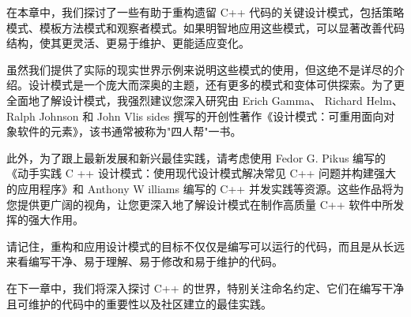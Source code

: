 在本章中，我们探讨了一些有助于重构遗留 C++ 代码的关键设计模式，包括策略模式、模板方法模式和观察者模式。如果明智地应用这些模式，可以显著改善代码结构，使其更灵活、更易于维护、更能适应变化。

虽然我们提供了实际的现实世界示例来说明这些模式的使用，但这绝不是详尽的介绍。设计模式是一个庞大而深奥的主题，还有更多的模式和变体可供探索。为了更全面地了解设计模式，我强烈建议您深入研究由 Erich Gamma、 Richard Helm、 Ralph Johnson 和 John Vlis sides 撰写的开创性著作《设计模式：可重用面向对象软件的元素》，该书通常被称为"四人帮"一书。

此外，为了跟上最新发展和新兴最佳实践，请考虑使用 Fedor G. Pikus 编写的《动手实践 C ++ 设计模式：使用现代设计模式解决常见 C++ 问题并构建强大的应用程序》和 Anthony W illiams 编写的 C++ 并发实践等资源。这些作品将为您提供更广阔的视角，让您更深入地了解设计模式在制作高质量 C++ 软件中所发挥的强大作用。

请记住，重构和应用设计模式的目标不仅仅是编写可以运行的代码，而且是从长远来看编写干净、易于理解、易于修改和易于维护的代码。

在下一章中，我们将深入探讨 C++ 的世界，特别关注命名约定、它们在编写干净且可维护的代码中的重要性以及社区建立的最佳实践。